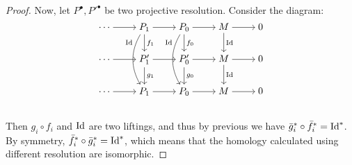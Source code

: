 \begin{theorem}
\begin{proof}
    Now, let $P^\bullet, {P'}^\bullet$ be two projective resolution. Consider the diagram:
    \[
      \begin{tikzcd}[cramped]
        \dotsm \ar[r] & P_1 \ar[r] \ar[d, "f_1"] \ar[dd, bend right, "\Id"' near start]
                      & P_0 \ar[r] \ar[d, "f_0"] \ar[dd, bend right, "\Id"' near start]
                      & M \ar[r] \ar[d, "\Id"] & 0 \\
        \dotsm \ar[r] & P'_1 \ar[r] \ar[d, "g_1"]
                      & P'_0 \ar[r] \ar[d, "g_0"]
                      & M \ar[r] \ar[d, "\Id"] & 0 \\
        \dotsm \ar[r] & P_1 \ar[r]
                      & P_0 \ar[r]
                      & M \ar[r] & 0 \\
      \end{tikzcd}
    \]
    Then $g_i \circ f_i$ and ${\rm Id}$ are two liftings, and thus by previous
    we have $\bar g_i^* \circ \bar f_i^* = {\rm Id}^*$.
    By symmetry, $\bar f_i^* \circ \bar g_i^* = {\rm Id}^*$, which means that
    the homology calculated using different resolution are isomorphic.

  \end{proof}
\end{theorem}

